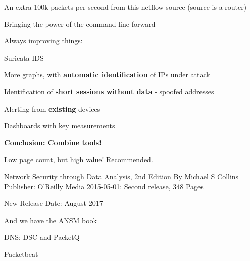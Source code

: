 \documentclass[Screen16to9,17pt]{foils}
\begin{document}


\centerline{An extra 100k packets per second from this netflow source (source is a router)}



\centerline{Bringing the power of the command line forward}



Always improving things:
\begin{list1}
\item Suricata IDS 
\item More graphs, with {\bf automatic identification} of IPs under attack
\item Identification of {\bf short sessions without data} - spoofed addresses
\item Alerting from {\bf existing} devices
\item Dashboards with key measurements
\end{list1}

\vskip 2cm
\centerline{\bf\Large Conclusion: Combine tools!}




Low page count, but high value! Recommended.

Network Security through Data Analysis, 2nd Edition
By Michael S Collins
Publisher: O'Reilly Media
2015-05-01: Second release, 348 Pages

New Release Date: August 2017

And we have the ANSM book



\begin{list2}
\item DNS: DSC and PacketQ 
\item Packetbeat 

\item {}
\item {}
\end{list2}
\end{document}
